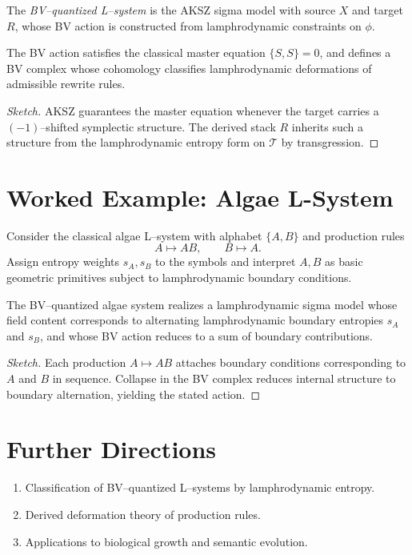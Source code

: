 \begin{definition}
The \emph{BV--quantized L--system} is the AKSZ sigma model with
source $X$ and target $R$, whose BV action is constructed from
lamphrodynamic constraints on $\phi$.
\end{definition}

\begin{proposition}
The BV action satisfies the classical master equation
$\{S,S\}=0$, and defines a BV complex whose cohomology classifies
lamphrodynamic deformations of admissible rewrite rules.
\end{proposition}

\begin{proof}[Sketch]
AKSZ guarantees the master equation whenever the target carries a
$(-1)$--shifted symplectic structure. The derived stack $R$ inherits
such a structure from the lamphrodynamic entropy form on $\mathcal{T}$
by transgression.
\end{proof}

\section{Worked Example: Algae L-System}

Consider the classical algae L--system with alphabet $\{A,B\}$ and
production rules
\[
  A\mapsto AB,\qquad B\mapsto A.
\]
Assign entropy weights $s_A,s_B$ to the symbols and interpret $A,B$ as
basic geometric primitives subject to lamphrodynamic boundary
conditions.

\begin{proposition}
The BV--quantized algae system realizes a lamphrodynamic sigma model
whose field content corresponds to alternating lamphrodynamic boundary
entropies $s_A$ and $s_B$, and whose BV action reduces to a sum of
boundary contributions.
\end{proposition}

\begin{proof}[Sketch]
Each production $A\mapsto AB$ attaches boundary conditions corresponding
to $A$ and $B$ in sequence. Collapse in the BV complex reduces internal
structure to boundary alternation, yielding the stated action.
\end{proof}

\section{Further Directions}

\begin{enumerate}
\item Classification of BV--quantized L--systems by lamphrodynamic
entropy.
\item Derived deformation theory of production rules.
\item Applications to biological growth and semantic evolution.
\end{enumerate}

\newpage

